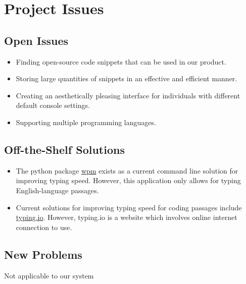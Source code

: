\documentclass[12pt, titlepage]{article}
\begin{document}

\section{Project Issues}

\subsection{Open Issues}
\begin{itemize}
    \item Finding open-source code snippets that can be used in our product.
    \item Storing large quantities of snippets in an effective and efficient manner.
    \item Creating an aesthetically pleasing interface for individuals with different default console settings.
    \item Supporting multiple programming languages.
\end{itemize}

\subsection{Off-the-Shelf Solutions}
\begin{itemize}
    \item The python package \href{https://github.com/cslarsen/wpm}{wpm} exists as a current command line solution for improving typing speed. However, this application only allows for typing English-language passages.
    \item Current solutions for improving typing speed for coding passages include \href{https://typing.io/}{typing.io}. However, typing.io is a website which involves online internet connection to use.
\end{itemize}

\subsection{New Problems}
Not applicable to our system
\end{document}

